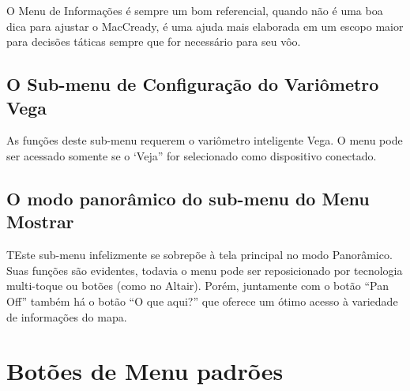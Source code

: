 O Menu de Informações é sempre um bom referencial, quando não é uma boa dica para ajustar o MacCready, é uma ajuda mais elaborada em um escopo maior para decisões táticas sempre que for necessário para seu vôo.


\subsection*{O Sub-menu de Configuração do Variômetro Vega}
\noindent{}

As funções deste sub-menu requerem o variômetro inteligente Vega.  O menu pode ser acessado somente se o ‘Veja” for selecionado como dispositivo conectado.

\subsection*{O modo panorâmico do sub-menu do Menu Mostrar}

\noindent{}

TEste sub-menu infelizmente se sobrepõe à tela principal no modo Panorâmico.  Suas funções são evidentes, todavia o menu pode ser reposicionado por tecnologia multi-toque ou botões (como no Altair).  Porém, juntamente com o botão “Pan Off” também há o botão “O que aqui?” que oferece um ótimo acesso à variedade de informações do mapa.

\section{Botões de Menu padrões}

